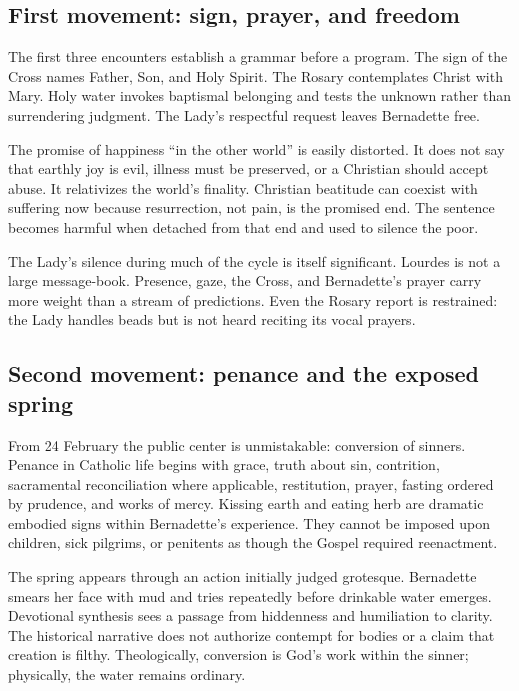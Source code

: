 \subsection{First movement: sign, prayer, and freedom}

The first three encounters establish a grammar before a program. The sign of the Cross names Father, Son, and Holy Spirit. The Rosary contemplates Christ with Mary. Holy water invokes baptismal belonging and tests the unknown rather than surrendering judgment. The Lady's respectful request leaves Bernadette free.

The promise of happiness “in the other world” is easily distorted. It does not say that earthly joy is evil, illness must be preserved, or a Christian should accept abuse. It relativizes the world's finality. Christian beatitude can coexist with suffering now because resurrection, not pain, is the promised end. The sentence becomes harmful when detached from that end and used to silence the poor.

The Lady's silence during much of the cycle is itself significant. Lourdes is not a large message-book. Presence, gaze, the Cross, and Bernadette's prayer carry more weight than a stream of predictions. Even the Rosary report is restrained: the Lady handles beads but is not heard reciting its vocal prayers.

\subsection{Second movement: penance and the exposed spring}

From 24 February the public center is unmistakable: conversion of sinners. Penance in Catholic life begins with grace, truth about sin, contrition, sacramental reconciliation where applicable, restitution, prayer, fasting ordered by prudence, and works of mercy. Kissing earth and eating herb are dramatic embodied signs within Bernadette's experience. They cannot be imposed upon children, sick pilgrims, or penitents as though the Gospel required reenactment.

The spring appears through an action initially judged grotesque. Bernadette smears her face with mud and tries repeatedly before drinkable water emerges. Devotional synthesis sees a passage from hiddenness and humiliation to clarity. The historical narrative does not authorize contempt for bodies or a claim that creation is filthy. Theologically, conversion is God's work within the sinner; physically, the water remains ordinary.

